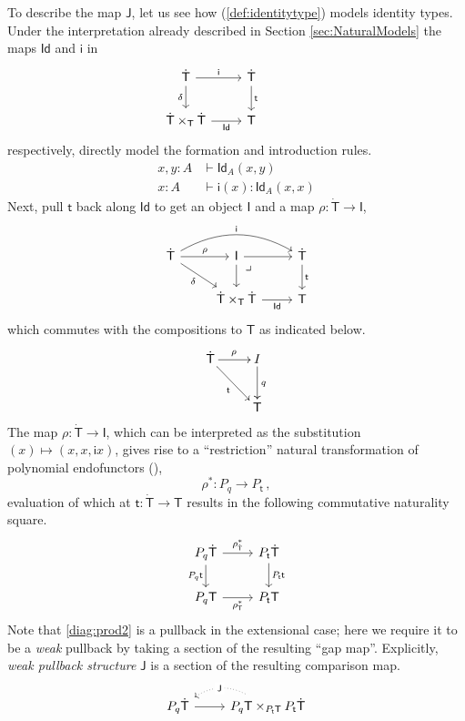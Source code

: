 \documentclass[12pt,reqno]{amsart}
\renewcommand{\to}{\ensuremath{\rightarrow}}
\newcommand{\Id}{\mathsf{Id}}
\renewcommand{\t}{\ensuremath{\mathsf{t}}}
\newcommand{\T}{\ensuremath{\mathsf{T}}}
\newcommand{\TT}{\ensuremath{\dot{\mathsf{T}}}}
\newcommand{\pbcorner}{\arrow[dr,phantom,"\lrcorner" very near start, shift right=.5ex]} %
\theoremstyle{remark}
\theoremstyle{definition}
\begin{document}
To describe the map $\mathsf{J}$, let us see how (\ref{def:identitytype}) models identity types.  Under the interpretation already described in Section \ref{sec:NaturalModels} the maps $\Id$ and $\mathsf{i}$  in 
\begin{equation*}%
\begin{tikzcd}
	\TT \ar[r,"\mathsf{i}"] \ar[d,swap,"\delta"] &  \TT \ar[d, "\t"]\\  
	\TT \times_\T \TT \ar[r, swap,"\mathsf{Id}"] & \T
 \end{tikzcd}\qquad \qquad 
 \end{equation*}
respectively, directly model the formation and introduction rules.
\begin{align*}
x, y:A &\vdash \Id_A(x, y)\\
x: A &\vdash \mathsf{i}(x) : \Id_A(x, x)
\end{align*}
Next, pull $\t$ back along $\mathsf{Id}$ to get an object $\mathsf{I}$ and a map $\rho  : \TT \to \mathsf{I}$,
%
\begin{equation*}%
\begin{tikzcd}
\TT \ar[rd,swap,"{\delta}"] \ar[r,"{\rho}"] \ar[rr, bend left,"{\mathsf{i}}"] & \mathsf{I} \ar[r]  \ar[d] \pbcorner &  \TT \ar[d, "\t"]\\
& \TT \times_\T \TT  \ar[r, swap,"{\mathsf{Id}}"]  & \T
\end{tikzcd}
\end{equation*}
%
which commutes with the compositions to $\T$ as indicated below.
%
\begin{equation*}%
\xymatrix{
\TT \ar[rd]_{\t} \ar[r]^{\rho} & I \ar[d]^{q}  \\
& \T 
}
\end{equation*}
%
The map $\rho  : \TT \to \mathsf{I}$, which can be interpreted as the substitution $(x) \mapsto (x, x, \mathsf{i}x)$, gives rise to a ``restriction'' natural transformation of polynomial endofunctors (\cite{GambinoKoch:2013}),
\[
\rho^* : P_q \to P_\t\,,
\]
evaluation of which at $\t:\TT \to\T$ results in the following commutative naturality square.
\begin{equation}\label{diag:prod2}
\begin{tikzcd}
P_q\TT \ar[d,swap, "{P_q \t}"] \ar[r, "{\rho^{*}_{\TT}}"] & P_\t\TT \ar[d, "{P_\t \t}"] \\
P_q\T \ar[r,swap, "{\rho^{*}_{\T}}"] &  P_\t\T 
\end{tikzcd}
\end{equation}
%
Note that \eqref{diag:prod2} is a pullback in the extensional case; here we require it to be a \emph{weak} pullback by taking a section of the resulting ``gap map''.   Explicitly, \emph{weak pullback structure} $\mathsf{J}$ is a section of the resulting comparison map.
\begin{equation}\label{def:wps}
\begin{tikzcd}
P_q \TT  \ar[r] & \ar[l, bend right, dotted, "\mathsf{J}" description] P_q\T \times_{P_\t\T} P_\t\TT 
\end{tikzcd}
\end{equation}
\end{document}
